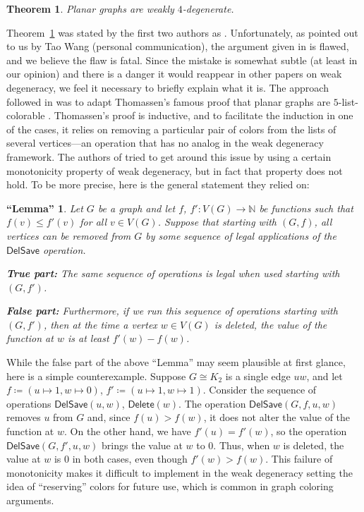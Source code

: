 \documentclass[11pt]{article}
\theoremstyle{slantthm}
\newtheorem{thm}{Theorem}[section]
\newtheorem*{false}{``Lemma''}
\numberwithin{equation}{section}
\theoremstyle{definition}
\renewcommand{\leq}{\leqslant}
\newcommand{\defeq}{\coloneqq}
\newcommand{\bemph}[1]{{\normalfont#1}}
\newcommand{\ep}[1]{\bemph{(}#1\bemph{)}}
\numberwithin{equation}{section}
\newcommand{\N}{\mathbb{N}}
\newcommand{\0}{\varnothing}
\newcommand{\del}{\mathsf{Delete}}
\newcommand{\delsave}{\mathsf{DelSave}}
\begin{document}
    \begin{thm}\label{thm:main}
        Planar graphs are weakly $4$-degenerate.
    \end{thm}

    Theorem~\ref{thm:main} was stated by the first two authors as \cite[Theorem 1.4]{WD}. Unfortunately, as pointed out to us by Tao Wang \ep{personal communication}, the argument given in \cite{WD} is flawed, and we believe the flaw is fatal. Since the mistake is somewhat subtle (at least in our opinion) and there is a danger it would reappear in other papers on weak degeneracy, we feel it necessary to briefly explain what it is. The approach followed in \cite{WD} was to adapt Thomassen's famous proof that planar graphs are $5$-list-colorable \cite{Thom}. Thomassen's proof is inductive, and to facilitate the induction in one of the cases, it relies on removing a particular pair of colors from the lists of several vertices---an operation that has no analog in the weak degeneracy framework. The authors of \cite{WD} tried to get around this issue by using a certain monotonicity property of weak degeneracy, but in fact that property does not hold. To be more precise, here is the general statement they relied on:

    \begin{false}
        Let $G$ be a graph and let $f$, $f' \colon V(G) \to \N$ be functions such that $f(v) \leq f'(v)$ for all $v \in V(G)$. Suppose that starting with $(G,f)$, all vertices can be removed from $G$ by some sequence of legal applications of the $\delsave$ operation.

        
         {\upshape\textbf{True part:}} The same sequence of operations is legal when used starting with $(G,f')$.

        
         {\upshape\textbf{False part:}} Furthermore, if we run this sequence of operations starting with $(G,f')$, then at the time a vertex $w \in V(G)$ is deleted, the value of the function at $w$ is at least $f'(w) - f(w)$. %
    \end{false}

    While the false part of the above ``Lemma'' may seem plausible at first glance, here is a simple counterexample. Suppose $G \cong K_2$ is a single edge $uw$, and let $f \defeq (u \mapsto 1, w \mapsto 0)$, $f' \defeq (u \mapsto 1, w \mapsto 1)$. Consider the sequence of operations $\delsave(u,w)$, $\del(w)$. The operation $\delsave(G,f,u,w)$ removes $u$ from $G$ and, since $f(u) > f(w)$, it does not alter the value of the function at $w$. On the other hand, we have $f'(u) = f'(w)$, so the operation $\delsave(G, f',u,w)$ brings the value at $w$ to $0$. Thus, when $w$ is deleted, the value at $w$ is $0$ in both cases, even though $f'(w) > f(w)$. This failure of monotonicity makes it difficult to implement in the weak degeneracy setting the idea of ``reserving'' colors for future use, which is common in graph coloring arguments.
    
\end{document}
